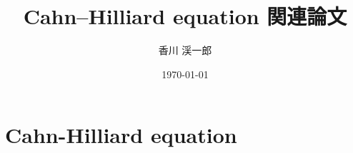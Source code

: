 \documentclass[openary, a4paper, oneside]{jsarticle}
\author{香川 渓一郎}
\date{\today}
\title{Cahn--Hilliard equation 関連論文}
\begin{document}
\maketitle
\tableofcontents

\section{Cahn-Hilliard equation}
\end{document}
